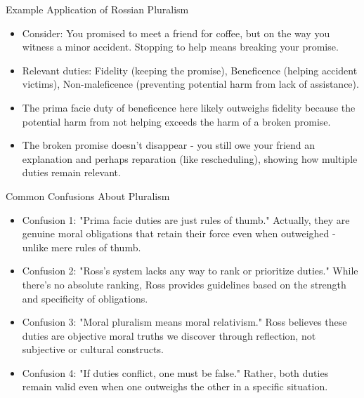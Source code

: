 \documentclass{beamer}
\begin{document}
\begin{frame}{Example Application of Rossian Pluralism}
\begin{itemize}
    \item Consider: You promised to meet a friend for coffee, but on the way you witness a minor accident. Stopping to help means breaking your promise.
    
    \item Relevant duties: Fidelity (keeping the promise), Beneficence (helping accident victims), Non-maleficence (preventing potential harm from lack of assistance).
    
    \item The prima facie duty of beneficence here likely outweighs fidelity because the potential harm from not helping exceeds the harm of a broken promise.
    
    \item The broken promise doesn't disappear - you still owe your friend an explanation and perhaps reparation (like rescheduling), showing how multiple duties remain relevant.
\end{itemize}
\end{frame}

\begin{frame}{Common Confusions About Pluralism}
\begin{itemize}
    \item Confusion 1: "Prima facie duties are just rules of thumb." Actually, they are genuine moral obligations that retain their force even when outweighed - unlike mere rules of thumb.
    
    \item Confusion 2: "Ross's system lacks any way to rank or prioritize duties." While there's no absolute ranking, Ross provides guidelines based on the strength and specificity of obligations.
    
    \item Confusion 3: "Moral pluralism means moral relativism." Ross believes these duties are objective moral truths we discover through reflection, not subjective or cultural constructs.
    
    \item Confusion 4: "If duties conflict, one must be false." Rather, both duties remain valid even when one outweighs the other in a specific situation.
\end{itemize}
\end{frame}
\end{document}
